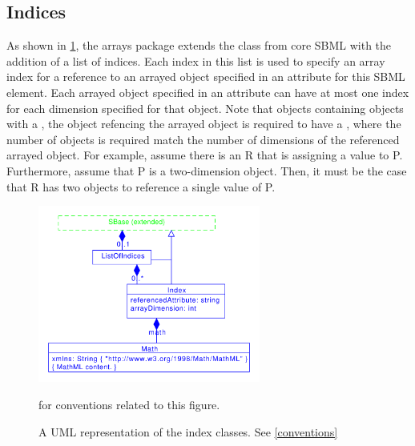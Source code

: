 \subsection{Indices}
\label{sec:index}

As shown in \ref{fig:indices_uml}, the arrays package extends the \SBase class from core SBML with the addition of a list of indices.   Each index in this list is used to specify an array index for a reference to an arrayed object specified in an attribute for this SBML element.       Each arrayed object specified in an attribute can have at most one index for each dimension specified for that object.    
{\color{red} Note that \SBase objects containing   objects with a \ListOfDimensions, the
  object refencing the arrayed object is required to have  a \ListOfIndices, where the number of
  \Index objects is required match the number of dimensions of the referenced
  arrayed object. For example, assume there is an \AssignmentRule R that
  is assigning a value to \Parameter P. Furthermore, assume that
  P is a two-dimension object.  Then, it must be the case
  that R has two \Index objects to reference a single value of
  P. }

\begin{figure}[tbhp]
    \centering
    \includegraphics[width=0.65\textwidth]{images/indicesUML.pdf}\\
    \caption{A UML representation of the index classes. See \ref{conventions}} for conventions related to this figure.  \label{fig:indices_uml}
\end{figure}

